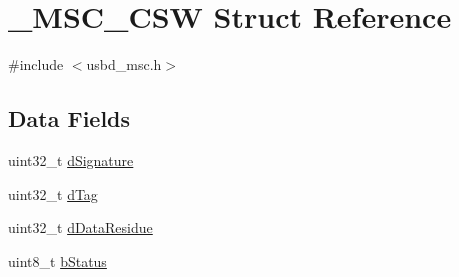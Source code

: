 \hypertarget{struct__MSC__CSW}{\section{\-\_\-\-M\-S\-C\-\_\-\-C\-S\-W Struct Reference}
\label{struct__MSC__CSW}
}


{\ttfamily \#include $<$usbd\-\_\-msc.\-h$>$}

\subsection*{Data Fields}
\begin{DoxyCompactItemize}
\item 
uint32\-\_\-t \hyperlink{struct__MSC__CSW_ab5e9fc6fcc75f4b6e5ca7aada1443913}{d\-Signature}
\item 
uint32\-\_\-t \hyperlink{struct__MSC__CSW_a6b340e8049b2f6b06d3747b42db1ebac}{d\-Tag}
\item 
uint32\-\_\-t \hyperlink{struct__MSC__CSW_a58a9d983a1e1707b9a99ad1a61acae72}{d\-Data\-Residue}
\item 
uint8\-\_\-t \hyperlink{struct__MSC__CSW_a6dc520801824afdf286135b22366cbbe}{b\-Status}
\end{DoxyCompactItemize}


